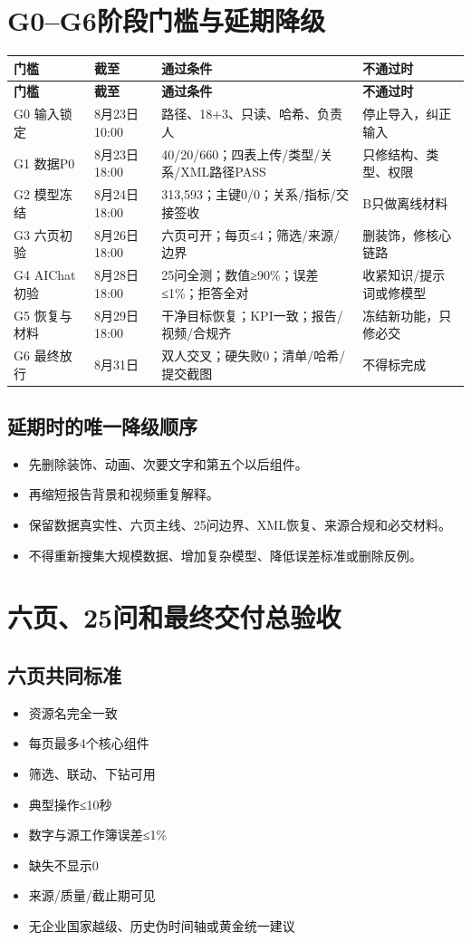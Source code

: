 \documentclass[UTF8,openany,zihao=-4]{ctexbook}
\renewcommand{\_}{\textunderscore\allowbreak}
\begin{document}
\chapter{G0--G6阶段门槛与延期降级}
\begin{longtable}{@{}p{}p{}p{}p{}@{}}
\toprule
\textbf{门槛} & \textbf{截至} & \textbf{通过条件} & \textbf{不通过时} \\
\midrule
\endfirsthead
\toprule
\textbf{门槛} & \textbf{截至} & \textbf{通过条件} & \textbf{不通过时} \\
\midrule
\endhead
G0 输入锁定 & 8月23日10:00 & 路径、18+3、只读、哈希、负责人 & 停止导入，纠正输入 \\
G1 数据P0 & 8月23日18:00 & 40/20/660；四表上传/类型/关系/XML路径PASS & 只修结构、类型、权限 \\
G2 模型冻结 & 8月24日18:00 & 313,593；主键0/0；关系/指标/交接签收 & B只做离线材料 \\
G3 六页初验 & 8月26日18:00 & 六页可开；每页≤4；筛选/来源/边界 & 删装饰，修核心链路 \\
G4 AIChat初验 & 8月28日18:00 & 25问全测；数值≥90\%；误差≤1\%；拒答全对 & 收紧知识/提示词或修模型 \\
G5 恢复与材料 & 8月29日18:00 & 干净目标恢复；KPI一致；报告/视频/合规齐 & 冻结新功能，只修必交 \\
G6 最终放行 & 8月31日 & 双人交叉；硬失败0；清单/哈希/提交截图 & 不得标完成 \\
\bottomrule
\end{longtable}
\section{延期时的唯一降级顺序}
\begin{itemize}
\item 先删除装饰、动画、次要文字和第五个以后组件。
\item 再缩短报告背景和视频重复解释。
\item 保留数据真实性、六页主线、25问边界、XML恢复、来源合规和必交材料。
\item 不得重新搜集大规模数据、增加复杂模型、降低误差标准或删除反例。
\end{itemize}
\chapter{六页、25问和最终交付总验收}
\section{六页共同标准}
\begin{itemize}[label=$\square$]
\item 资源名完全一致
\item 每页最多4个核心组件
\item 筛选、联动、下钻可用
\item 典型操作≤10秒
\item 数字与源工作簿误差≤1\%
\item 缺失不显示0
\item 来源/质量/截止期可见
\item 无企业国家越级、历史伪时间轴或黄金统一建议
\end{itemize}
\end{document}
